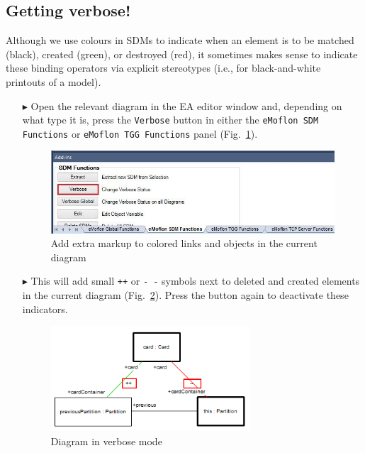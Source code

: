 \subsection{Getting verbose!}

Although we use colours in SDMs to indicate when an element is to be matched (black), created (green), or destroyed (red), it sometimes makes sense to
indicate these binding operators via explicit stereotypes (i.e., for black-and-white printouts of a model).

\begin{enumerate}
  
\item[$\blacktriangleright$] Open the relevant diagram in the EA editor window and, depending on what type it is, press the \texttt{Verbose} button in
either the \texttt{eMoflon SDM Functions} or \texttt{eMoflon TGG Functions} panel (Fig.~\ref{ea:changeVStatus}).

\vspace{0.5cm}

\begin{figure}[htbp]
\begin{center}
  \includegraphics[width=\textwidth]{ea_changeVerboseStatus}
  \caption{Add extra markup to colored links and objects in the current diagram}  
  \label{ea:changeVStatus}
\end{center}
\end{figure}

\item[$\blacktriangleright$] This will add small \texttt{++} or \texttt{-~-} symbols next to deleted and created elements in the current diagram
(Fig.~\ref{ea:verboseSymbols}). Press the button again to deactivate these indicators.

\begin{figure}[htbp]
\begin{center}
  \includegraphics[width=0.7\textwidth]{ea_verboseSymbols}
  \caption{Diagram in verbose mode}  
  \label{ea:verboseSymbols}
\end{center}
\end{figure}

\end{enumerate}
